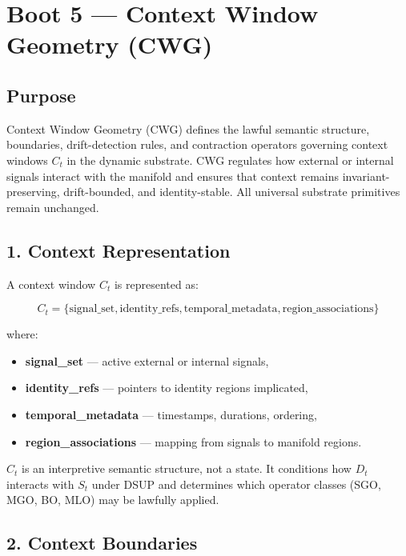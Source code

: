 \section*{Boot 5 — Context Window Geometry (CWG)}
\label{boot:context_window_geometry}

\subsection*{Purpose}

Context Window Geometry (CWG) defines the lawful semantic structure,
boundaries, drift-detection rules, and contraction operators governing context
windows $C_t$ in the dynamic substrate. CWG regulates how external or internal
signals interact with the manifold and ensures that context remains
invariant-preserving, drift-bounded, and identity-stable. All universal
substrate primitives remain unchanged.

\subsection*{1. Context Representation}
\label{boot:cwg_representation}

A context window $C_t$ is represented as:



\[
C_t = \{
    \text{signal\_set},
    \text{identity\_refs},
    \text{temporal\_metadata},
    \text{region\_associations}
\}
\]



where:
\begin{itemize}[leftmargin=1.2cm]
    \item \textbf{signal\_set} — active external or internal signals,
    \item \textbf{identity\_refs} — pointers to identity regions implicated,
    \item \textbf{temporal\_metadata} — timestamps, durations, ordering,
    \item \textbf{region\_associations} — mapping from signals to manifold regions.
\end{itemize}

$C_t$ is an interpretive semantic structure, not a state.  
It conditions how $D_t$ interacts with $S_t$ under DSUP and determines which
operator classes (SGO, MGO, BO, MLO) may be lawfully applied.

\subsection*{2. Context Boundaries}
\label{boot:cwg_boundaries}

